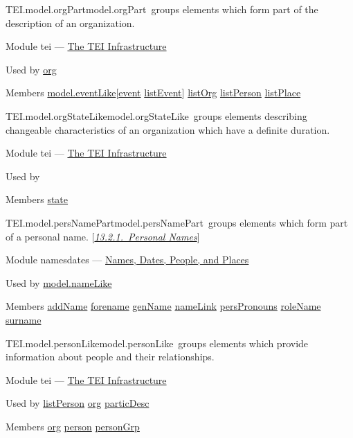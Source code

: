 \begin{reflist}
\item[]\begin{specHead}{TEI.model.orgPart}{model.orgPart} groups elements which form part of the description of an organization.\end{specHead} 
    \item[{Module}]
  tei — \hyperref[ST]{The TEI Infrastructure}
    \item[{Used by}]
  \hyperref[TEI.org]{org}
    \item[{Members}]
  \hyperref[TEI.model.eventLike]{model.eventLike}[\hyperref[TEI.event]{event} \hyperref[TEI.listEvent]{listEvent}] \hyperref[TEI.listOrg]{listOrg} \hyperref[TEI.listPerson]{listPerson} \hyperref[TEI.listPlace]{listPlace}
\end{reflist}  
\begin{reflist}
\item[]\begin{specHead}{TEI.model.orgStateLike}{model.orgStateLike} groups elements describing changeable characteristics of an organization which have a definite duration.\end{specHead} 
    \item[{Module}]
  tei — \hyperref[ST]{The TEI Infrastructure}
    \item[{Used by}]
  
    \item[{Members}]
  \hyperref[TEI.state]{state}
\end{reflist}  
\begin{reflist}
\item[]\begin{specHead}{TEI.model.persNamePart}{model.persNamePart} groups elements which form part of a personal name. [\textit{\hyperref[NDPER]{13.2.1.\ Personal Names}}]\end{specHead} 
    \item[{Module}]
  namesdates — \hyperref[ND]{Names, Dates, People, and Places}
    \item[{Used by}]
  \hyperref[TEI.model.nameLike]{model.nameLike}
    \item[{Members}]
  \hyperref[TEI.addName]{addName} \hyperref[TEI.forename]{forename} \hyperref[TEI.genName]{genName} \hyperref[TEI.nameLink]{nameLink} \hyperref[TEI.persPronouns]{persPronouns} \hyperref[TEI.roleName]{roleName} \hyperref[TEI.surname]{surname}
\end{reflist}  
\begin{reflist}
\item[]\begin{specHead}{TEI.model.personLike}{model.personLike} groups elements which provide information about people and their relationships.\end{specHead} 
    \item[{Module}]
  tei — \hyperref[ST]{The TEI Infrastructure}
    \item[{Used by}]
  \hyperref[TEI.listPerson]{listPerson} \hyperref[TEI.org]{org} \hyperref[TEI.particDesc]{particDesc}
    \item[{Members}]
  \hyperref[TEI.org]{org} \hyperref[TEI.person]{person} \hyperref[TEI.personGrp]{personGrp}
\end{reflist}  
